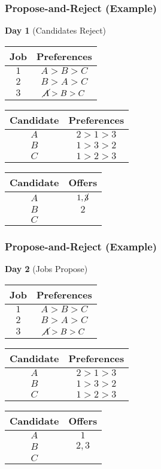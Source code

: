 \documentclass{beamer}
\begin{document}
\begin{frame}
    \frametitle{Propose-and-Reject (Example)}
    {\bf Day 1} (Candidates Reject)
    \begin{center}
        \begin{tabular}{c|c}
            Job & Preferences \\
            \hline
            $1$ & $A>B>C$\\
            $2$ & $B>A>C$\\
            $3$ & $\cancel{A}>B>C$
        \end{tabular}
        \hspace{10pt}
        \begin{tabular}{c|c}
            Candidate & Preferences \\
            \hline
            $A$ & $2>1>3$\\
            $B$ & $1>3>2$\\
            $C$ & $1>2>3$
        \end{tabular}
    \end{center}
    \begin{center}
        \begin{tabular}{c|c}
            Candidate & Offers \\
            \hline
            $A$ & $1,\cancel{3}$ \\
            $B$ & $2$ \\
            $C$ & 
        \end{tabular}
    \end{center}
\end{frame}

\begin{frame}
    \frametitle{Propose-and-Reject (Example)}
    {\bf Day 2} (Jobs Propose)
    \begin{center}
        \begin{tabular}{c|c}
            Job & Preferences \\
            \hline
            $1$ & $A>B>C$\\
            $2$ & $B>A>C$\\
            $3$ & $\cancel{A}>B>C$
        \end{tabular}
        \hspace{10pt}
        \begin{tabular}{c|c}
            Candidate & Preferences \\
            \hline
            $A$ & $2>1>3$\\
            $B$ & $1>3>2$\\
            $C$ & $1>2>3$
        \end{tabular}
    \end{center}
    \begin{center}
        \begin{tabular}{c|c}
            Candidate & Offers \\
            \hline
            $A$ & $1$ \\
            $B$ & $2,3$ \\
            $C$ & 
        \end{tabular}
    \end{center}
\end{frame}
\end{document}

